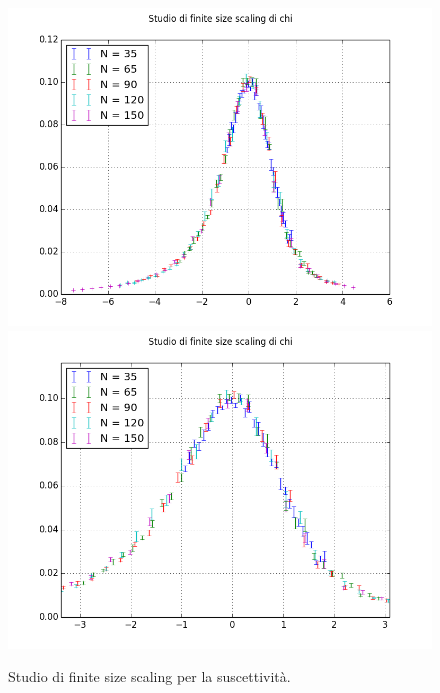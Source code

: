\begin{center}
	\begin{figure}
		\centering

		\includegraphics[scale=0.55]{potts/chifss.png}
				\includegraphics[scale=0.55]{potts/chifsszoom.png}

		\caption{Studio di finite size scaling per la suscettività.}	
	\end{figure}
\end{center}
